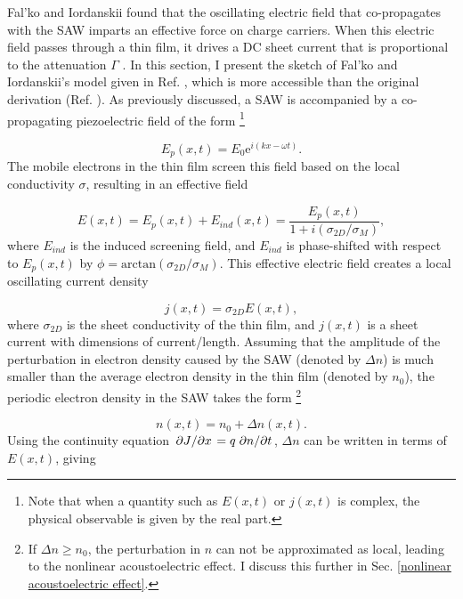 \documentclass[double,12pt,1in]{beavtex}
\begin{document}
Fal'ko and Iordanskii found that the oscillating electric field that co-propagates with the SAW imparts an effective force on charge carriers. When this electric field passes through a thin film, it drives a DC sheet current that is proportional to the attenuation $\Gamma$ \cite{falko_acoustoelectric_1993}. In this section, I present the sketch of Fal'ko and Iordanskii's model given in Ref. \cite{esslinger_ultrasonic_1994}, which is more accessible than the original derivation (Ref. \cite{falko_acoustoelectric_1993}). As previously discussed, a SAW is accompanied by a co-propagating piezoelectric field of the form \footnote{Note that when a quantity such as $E(x,t)$ or $j(x,t)$ is complex, the physical observable is given by the real part.}

\begin{equation}
    E_p(x, t) = E_0 \mathrm{e}^{i(kx - \omega t)}. \label{SAW plane wave}
\end{equation}
The mobile electrons in the thin film screen this field based on the local conductivity $\sigma$, resulting in an effective field

\begin{equation}
    E(x,t) = E_p(x,t) + E_{ind}(x,t) = \frac{E_p(x,t)}{1+i(\sigma_{2D}/\sigma_M)}, \label{E eff}
\end{equation}
where $E_{ind}$ is the induced screening field, and $E_{ind}$ is phase-shifted with respect to $E_p(x,t)$ by $\phi = \mathrm{arctan}(\sigma_{2D}/\sigma_M)$.
This effective electric field creates a local oscillating current density

\begin{equation}
    j(x,t) = \sigma_{2D} E(x,t), \label{2D AE ohm's law}
\end{equation}
where $\sigma_{2D}$ is the sheet conductivity of the thin film, and $j(x,t)$ is a sheet current with dimensions of current/length. Assuming that the amplitude of the perturbation in electron density caused by the SAW (denoted by $\Delta n$) is much smaller than the average electron density in the thin film (denoted by $n_0$), the periodic electron density in the SAW takes the form \footnote{If $\Delta n \geq n_0$, the perturbation in $n$ can not be approximated as local, leading to the nonlinear acoustoelectric effect. I discuss this further in Sec. \ref{nonlinear acoustoelectric effect}.}


\begin{equation}
    n(x,t) = n_0 + \Delta n(x,t). 
\end{equation}
Using the continuity equation $\pdv*{J}{x} = q \pdv*{n}{t}$, $\Delta n$ can be written in terms of $E(x,t)$, giving
\end{document}
